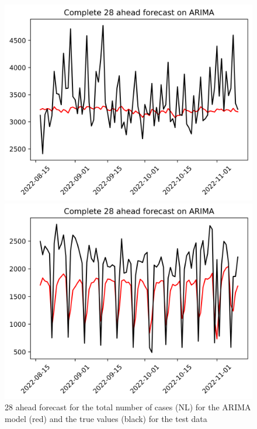 \begin{figure}

\begin{minipage}{.32\textwidth}
  \centering
  \includegraphics[width=\linewidth]{pics/28_ah/Complete_28_ahead_ARIMA.png}
  \caption{28 ahead forecast for the total number of cases (NL) for the ARIMA model (red) and the true values (black) for the test data}
  \label{fig:tot_cases_fc_28_ARIMA}
\end{minipage}
\begin{minipage}{.32\textwidth}
  \centering
  \includegraphics[width=\linewidth]{pics/28_ah/DE_Complete_28_ahead_ARIMA.png}

\end{minipage}
\end{figure}
